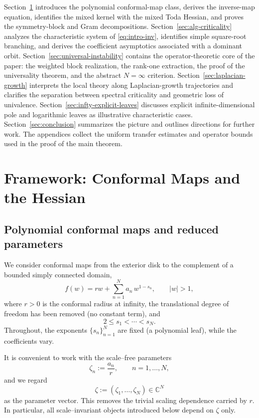 \documentclass[11pt]{amsart}
\numberwithin{equation}{section}
\theoremstyle{plain}
\theoremstyle{definition}
\theoremstyle{remark}
\newcommand{\CC}{\mathbb{C}}
\begin{document}
\label{subsec:organization}

Section~\ref{sec:framework} introduces the polynomial conformal-map class,
derives the inverse-map equation, identifies the mixed kernel with the mixed
Toda Hessian, and proves the symmetry-block and Gram decompositions.
Section~\ref{sec:alg-criticality} analyzes the characteristic system of
\eqref{eq:intro-inv}, identifies simple square-root branching, and derives the
coefficient asymptotics associated with a dominant orbit.
Section~\ref{sec:universal-instability} contains the operator-theoretic core
of the paper: the weighted block realization, the rank-one extraction, the
proof of the universality theorem, and the abstract \(N=\infty\) criterion.
Section~\ref{sec:laplacian-growth} interprets the local theory along
Laplacian-growth trajectories and clarifies the separation between spectral
criticality and geometric loss of univalence.
Section~\ref{sec:infty-explicit-leaves} discusses explicit infinite-dimensional
pole and logarithmic leaves as illustrative characteristic cases.
Section~\ref{sec:conclusion} summarizes the picture and outlines directions
for further work.  The appendices collect the uniform transfer estimates and
operator bounds used in the proof of the main theorem.


\section{Framework: Conformal Maps and the Hessian}
\label{sec:framework}


\subsection{Polynomial conformal maps and reduced parameters}

We consider conformal maps from the exterior disk to the complement of a bounded simply connected
domain,
\begin{equation}\label{eq:framework-map}
	f(w)=r w+\sum_{n=1}^{N} a_n\,w^{1-s_n},
	\qquad |w|>1,
\end{equation}
where $r>0$ is the conformal radius at infinity, the translational degree of freedom has been
removed (no constant term), and
\[
	2\le s_1<\cdots<s_N.
\]
Throughout, the exponents $\{s_n\}_{n=1}^N$ are fixed (a polynomial leaf), while the coefficients
vary.

It is convenient to work with the scale--free parameters
\begin{equation}\label{eq:reduced-parameters}
	\zeta_n:=\frac{a_n}{r},\qquad n=1,\dots,N,
\end{equation}
and we regard
\[
	\zeta:=(\zeta_1,\dots,\zeta_N)\in\CC^N
\]
as the parameter vector. This removes the trivial scaling dependence carried by $r$. In particular,
all scale--invariant objects introduced below depend on $\zeta$ only.
\end{document}
